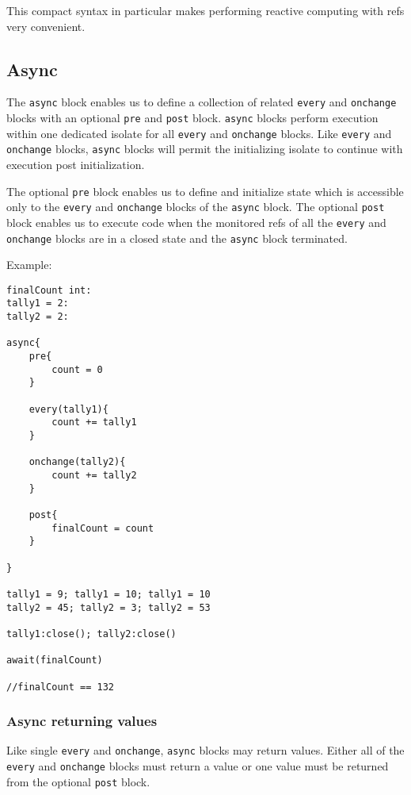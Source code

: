\documentclass[conc-doc]{subfiles}
\begin{document}
This compact syntax in particular makes performing reactive computing with refs very convenient.





\subsection{Async}
The \lstinline{async} block enables us to define a collection of related \lstinline{every} and \lstinline{onchange} blocks with an optional \lstinline{pre} and \lstinline{post} block. \lstinline{async} blocks perform execution within one dedicated isolate for all \lstinline{every} and \lstinline{onchange} blocks. Like \lstinline{every} and \lstinline{onchange} blocks, \lstinline{async} blocks will permit the initializing isolate to continue with execution post initialization.

The optional \lstinline{pre} block enables us to define and initialize state which is accessible only to the \lstinline{every} and \lstinline{onchange} blocks of the \lstinline{async} block. The optional \lstinline{post} block enables us to execute code when the monitored refs of all the \lstinline{every} and \lstinline{onchange} blocks are in a closed state and the \lstinline{async} block terminated.

Example:

\begin{lstlisting}
finalCount int:
tally1 = 2:
tally2 = 2:

async{
	pre{
		count = 0
	}
	
	every(tally1){
		count += tally1	
	}		
	
	onchange(tally2){
		count += tally2		
	}
	
	post{
		finalCount = count
	}
	
}

tally1 = 9; tally1 = 10; tally1 = 10
tally2 = 45; tally2 = 3; tally2 = 53

tally1:close(); tally2:close()

await(finalCount)

//finalCount == 132
\end{lstlisting}

\subsubsection{Async returning values}
Like single \lstinline{every} and \lstinline{onchange}, \lstinline{async} blocks may return values. Either all of the \lstinline{every} and \lstinline{onchange} blocks must return a value or one value must be returned from the optional \lstinline{post} block.
\end{document}
